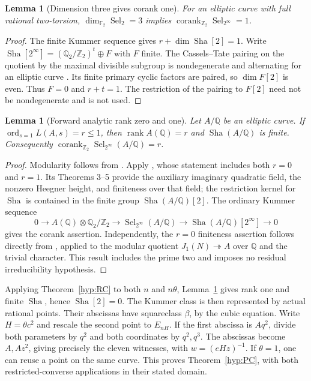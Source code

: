 \documentclass[11pt]{article}
\newtheorem{lemma}[theorem]{Lemma}
\theoremstyle{definition}
\theoremstyle{remark}
\newcommand{\Q}{\mathbb Q}
\newcommand{\Z}{\mathbb Z}
\newcommand{\F}{\mathbb F}
\newcommand{\Sel}{\operatorname{Sel}}
\newcommand{\Sha}{\operatorname{Sha}}
\newcommand{\ord}{\operatorname{ord}}
\begin{document}
\begin{lemma}[Dimension three gives corank one]\label{lem:corank}
For an elliptic curve with full rational two-torsion,
$\dim_{\F_2}\Sel_2=3$ implies $\operatorname{corank}_{\Z_2}\Sel_{2^\infty}=1$.
\end{lemma}
\begin{proof}
The finite Kummer sequence gives $r+\dim\Sha[2]=1$.
Write $\Sha[2^\infty]=(\Q_2/\Z_2)^t\oplus F$ with $F$ finite.
The Cassels--Tate pairing on the quotient by the maximal divisible
subgroup is nondegenerate and alternating for an elliptic curve
\cite{poonenstoll}. Its finite primary cyclic factors are paired,
so $\dim F[2]$ is even. Thus $F=0$ and $r+t=1$. The restriction of
the pairing to $F[2]$ need not be nondegenerate and is not used.
\end{proof}

\begin{lemma}[Forward analytic rank zero and one]\label{lem:forward-rank}
Let $A/\Q$ be an elliptic curve. If $\ord_{s=1}L(A,s)=r\leq1$,
then $\operatorname{rank}A(\Q)=r$ and $\Sha(A/\Q)$ is finite.
Consequently $\operatorname{corank}_{\Z_2}\Sel_{2^\infty}(A/\Q)=r$.
\end{lemma}
\begin{proof}
Modularity follows from \cite[Theorem A]{bcdt}.
Apply \cite[Theorem 1, pp.~4--5]{kolyvagin}, whose statement
includes both $r=0$ and $r=1$. Its Theorems 3--5 provide the
auxiliary imaginary quadratic field, the nonzero Heegner height,
and finiteness over that field; the restriction kernel for $\Sha$
is contained in the finite group $\Sha(A/\Q)[2]$.
The ordinary Kummer sequence
\[
0\longrightarrow A(\Q)\otimes\Q_2/\Z_2
\longrightarrow\Sel_{2^\infty}(A/\Q)
\longrightarrow\Sha(A/\Q)[2^\infty]\longrightarrow0
\]
gives the corank assertion. Independently, the $r=0$ finiteness
assertion follows directly from \cite[Corollary 14.3]{kato},
applied to the modular quotient $J_1(N)\twoheadrightarrow A$
over $\Q$ and the trivial character. This result includes the
prime two and imposes no residual irreducibility hypothesis.
\end{proof}

Applying Theorem~\ref{hyp:RC} to both $n$ and $n\theta$,
Lemma~\ref{lem:forward-rank} gives rank one and finite $\Sha$, hence
$\Sha[2]=0$.
The Kummer class is then represented by actual rational points. Their
abscissas have squareclass $\beta$, by the cubic equation. Write
$H=\theta c^2$ and rescale the second point to $E_{nH}$. If the first
abscissa is $Aq^2$, divide both parameters by $q^2$ and both coordinates
by $q^2,q^3$. The abscissas become $A,Az^2$, giving precisely the
eleven witnesses, with $w=(eHz)^{-1}$. If $\theta=1$, one can reuse
a point on the same curve. This proves Theorem~\ref{hyp:PC}, with both
restricted-converse applications in their stated domain.
\end{document}

